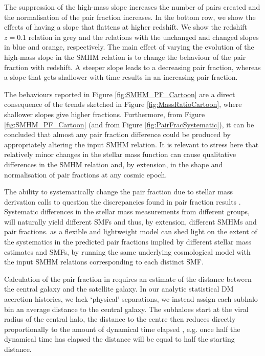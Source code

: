 The suppression of the high-mass slope increases the number of pairs created and the normalisation of the pair fraction increases. 
In the bottom row, we show the effects of having a slope that flattens at higher redshift. 
We show the redshift $z=0.1$ relation in grey and the relations with the unchanged and changed slopes in blue and orange, respectively. 
The main effect of varying the evolution of the high-mass slope in the SMHM relation is to change the behaviour of the pair fraction with redshift. 
A steeper slope leads to a decreasing pair fraction, whereas a slope that gets shallower with time results in an increasing pair fraction.

The behaviours reported in Figure \ref{fig:SMHM_PF_Cartoon} are a direct consequence of the trends sketched in Figure \ref{fig:MassRatioCartoon}, where shallower slopes give higher fractions. 
Furthermore, from Figure \ref{fig:SMHM_PF_Cartoon} (and from Figure \ref{fig:PairFracSystematic}), it can be concluded that almost any pair fraction difference could be produced by appropriately altering the input SMHM relation. 
It is relevant to stress here that relatively minor changes in the stellar mass function can cause qualitative differences in the SMHM relation and, by extension, in the shape and normalisation of pair fractions at any cosmic epoch.

The ability to systematically change the pair fraction due to stellar mass derivation calls to question the discrepancies found in pair fraction results \citep[e.g.][]{Man2016RESOLVING03}. 
Systematic differences in the stellar mass measurements from different groups, will naturally yield different SMFs and thus, by extension, different SMHMs and pair fractions.  
\steel as a flexible and lightweight model can shed light on the extent of the systematics in the predicted pair fractions implied by different stellar mass estimates and SMFs, by running the same underlying cosmological model with the input SMHM relations corresponding to each distinct SMF.

Calculation of the pair fraction in \steel requires an estimate of the distance between the central galaxy and the satellite galaxy. In our analytic statistical DM accretion histories, we lack `physical' separations, we instead assign each subhalo bin an average distance to the central galaxy. 
The subhaloes start at the viral radius of the central halo, the distance to the centre then reduces directly proportionally to the amount of dynamical time elapsed \citep{Guo2011FromCosmology}, e.g. once half the dynamical time has elapsed the distance will be equal to half the starting distance.


